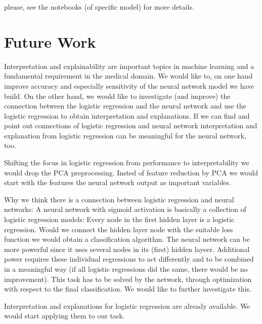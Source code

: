 \documentclass[]{article}
\begin{document}
please, see the notebooks (of specific model) for more details.

\section{Future Work}\label{future-work}

Interpretation and explainability are important topics in machine
learning and a fundamental requirement in the medical domain. We would
like to, on one hand improve accuracy and especially sensitivity of the
neural network model we have build. On the other hand, we would like to
investigate (and improve) the connection between the logistic regression
and the neural network and use the logistic regression to obtain
interpretation and explanations. If we can find and point out
connections of logistic regression and neural network interpretation and
explanation from logistic regression can be meaningful for the neural
network, too.

Shifting the focus in logistic regression from performance to
interpretability we would drop the PCA preprocessing. Insted of feature
reduction by PCA we would start with the features the neural network
output as important variables.

Why we think there is a connection between logistic regression and
neural networks: A neural network with sigmoid activation is basically a
collection of logistic regression models: Every node in the first hidden
layer is a logistic regression. Would we connect the hidden layer node
with the suitable loss function we would obtain a classification
algorithm. The neural network can be more powerful since it uses several
nodes in its (first) hidden layeer. Additional power requires these
individual regressions to act differently and to be combined in a
meaningful way (if all logistic regressions did the same, there would be
no improvement). This task has to be solved by the network, through
optimization with respect to the final classification. We would like to
further investigate this.

Interpretation and explanations for logistic regression are already
available. We would start applying them to our task.

\renewcommand\refname{References}

\end{document}
